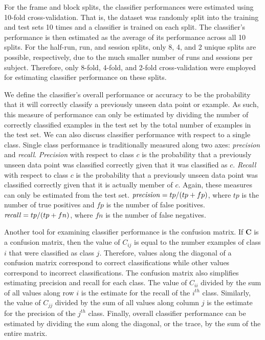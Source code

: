 \documentclass[preprint,5p,authoryear]{elsarticle}
\begin{document}
For the frame and block splits, the classifier performances were estimated using 10-fold cross-validation.
That is, the dataset was randomly split into the training and test sets 10 times and a classifier is trained on each split.
The classifier's performance is then estimated as the average of its performance across all 10 splits.
For the half-run, run, and session splits, only 8, 4, and 2 unique splits are possible, respectively, due to the much smaller number of runs and sessions per subject. 
Therefore, only 8-fold, 4-fold, and 2-fold cross-validation were employed for estimating classifier performance on these splits.

We define the classifier's overall performance or accuracy to be the probability that it will correctly classify a previously unseen data point or example.
As such, this measure of performance can only be estimated by dividing the number of correctly classified examples in the test set by the total number of examples in the test set.
We can also discuss classifier performance with respect to a single class.
Single class performance is traditionally measured along two axes: \emph{precision} and \emph{recall}.
\emph{Precision} with respect to class $c$ is the probability that a previously unseen data point was classified correctly given that it was classified as $c$.
\emph{Recall} with respect to class $c$ is the probability that a previously unseen data point was classified correctly given that it is actually member of $c$.
Again, these measures can only be estimated from the test set.
$\mbox{\emph{precision}} = tp / (tp + fp)$, where $tp$ is the number of true positives and $fp$ is the number of false positives.
$\mbox{\emph{recall}} = tp / (tp + fn)$, where $fn$ is the number of false negatives.

Another tool for examining classifier performance is the confusion matrix.
If $\mathbf{C}$ is a confusion matrix, then the value of $C_{ij}$ is equal to the number examples of class $i$ that were classified as class $j$.
Therefore, values along the diagonal of a confusion matrix correspond to correct classifications while other values correspond to incorrect classifications.
The confusion matrix also simplifies estimating precision and recall for each class.
The value of $C_{ii}$ divided by the sum of all values along row $i$ is the estimate for the recall of the $i^{th}$ class.
Similarly, the value of $C_{jj}$ divided by the sum of all values along column $j$ is the estimate for the precision of the $j^{th}$ class.
Finally, overall classifier performance can be estimated by dividing the sum along the diagonal, or the trace, by the sum of the entire matrix.
\end{document}
